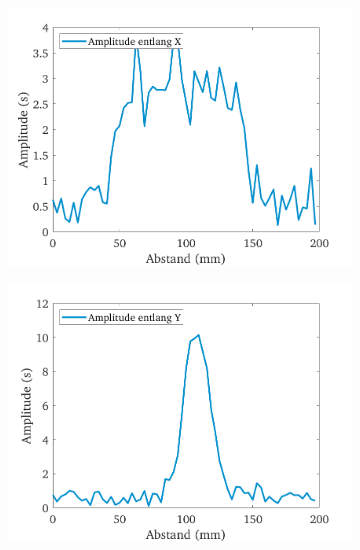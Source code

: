 \documentclass[../../main.tex]{subfiles}
\begin{document}
        \begin{figure}[h!]
            \begin{subfigure}[c]{0.5\textwidth}
                \includegraphics[width=\linewidth]{Bilddateien/12/X/Fig_1}
                \label{fig:MRI_1D_X}
            \end{subfigure}
            \begin{subfigure}[c]{0.5\textwidth}
                \includegraphics[width=\linewidth]{Bilddateien/12/Y/Fig_1}
                \label{fig:MRI_1D_Y}
            \end{subfigure}
            \begin{subfigure}[c]{0.5\textwidth}

\end{subfigure}
\end{figure}
\end{document}
